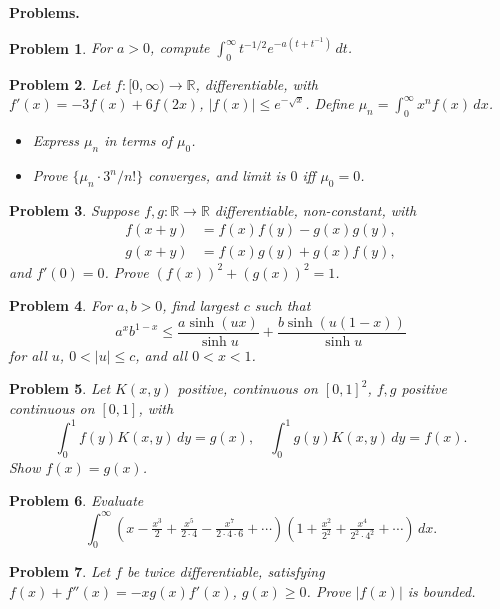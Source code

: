 \documentclass[12pt]{article}
\newtheorem{problem}{Problem}
\begin{document}
\textbf{Problems.}

\begin{problem}
For $a>0$, compute $\int_0^\infty t^{-1/2} e^{-a(t+t^{-1})}\,dt$.
\end{problem}

\begin{problem}
Let $f:[0,\infty)\to\mathbb{R}$, differentiable, with $f'(x)=-3f(x)+6f(2x)$, $|f(x)|\leq e^{-\sqrt{x}}$. Define $\mu_n=\int_0^\infty x^n f(x)\,dx$.
\begin{itemize}
\item[(a)] Express $\mu_n$ in terms of $\mu_0$.
\item[(b)] Prove $\{\mu_n\cdot 3^n/n!\}$ converges, and limit is $0$ iff $\mu_0=0$.
\end{itemize}
\end{problem}

\begin{problem}
Suppose $f,g:\mathbb{R}\to\mathbb{R}$ differentiable, non-constant, with
\begin{align*}
f(x+y)&=f(x)f(y)-g(x)g(y),\\
g(x+y)&=f(x)g(y)+g(x)f(y),
\end{align*}
and $f'(0)=0$. Prove $(f(x))^2+(g(x))^2=1$.
\end{problem}

\begin{problem}
For $a,b>0$, find largest $c$ such that
\[
a^x b^{1-x}\leq \frac{a\sinh(ux)}{\sinh u}+\frac{b\sinh(u(1-x))}{\sinh u}
\]
for all $u$, $0<|u|\leq c$, and all $0<x<1$.
\end{problem}

\begin{problem}
Let $K(x,y)$ positive, continuous on $[0,1]^2$, $f,g$ positive continuous on $[0,1]$, with
\[\int_0^1 f(y)K(x,y)\,dy=g(x),\quad \int_0^1 g(y)K(x,y)\,dy=f(x).\]
Show $f(x)=g(x)$.
\end{problem}

\begin{problem}
Evaluate
\[
\int_0^\infty \left(x-\tfrac{x^3}{2}+\tfrac{x^5}{2\cdot4}-\tfrac{x^7}{2\cdot4\cdot6}+\cdots\right)\left(1+\tfrac{x^2}{2^2}+\tfrac{x^4}{2^2\cdot4^2}+\cdots\right)\,dx.
\]
\end{problem}

\begin{problem}
Let $f$ be twice differentiable, satisfying $f(x)+f''(x)=-xg(x)f'(x)$, $g(x)\geq0$. Prove $|f(x)|$ is bounded.
\end{problem}
\end{document}
